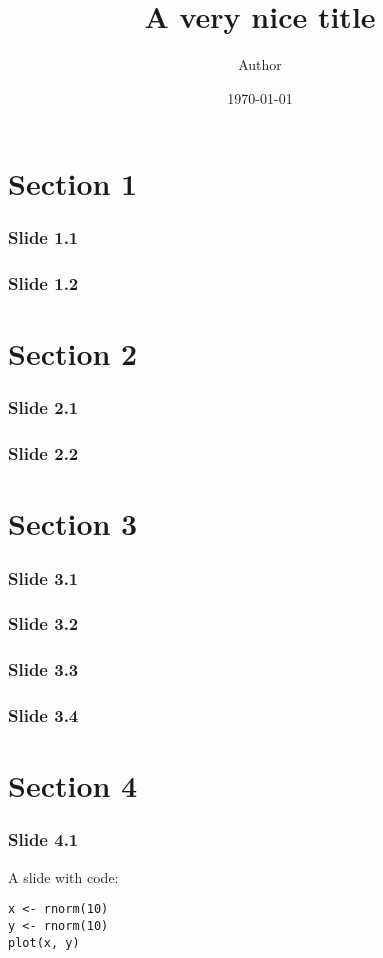 \documentclass{beamer}
\title{A very nice title}
\author{Author}
\date{\today}
\begin{document}
\begin{frame}
\titlepage
\end{frame}

\section{Section 1}

\begin{frame}
\frametitle{Slide 1.1}
\blindtext
\end{frame}

\begin{frame}
\frametitle{Slide 1.2}
\blindtext
\end{frame}

\section{Section 2}

\begin{frame}
\frametitle{Slide 2.1}
\blindtext
\end{frame}

\begin{frame}
\frametitle{Slide 2.2}
\blindtext
\end{frame}

\section{Section 3}

\begin{frame}
\frametitle{Slide 3.1}
\blindtext
\end{frame}

\begin{frame}
\frametitle{Slide 3.2}
\blindtext
\end{frame}

\begin{frame}
\frametitle{Slide 3.3}
\blindtext
\end{frame}

\begin{frame}
\frametitle{Slide 3.4}
\blindtext
\end{frame}

\section{Section 4}

\begin{frame}[fragile] %
\frametitle{Slide 4.1}
A slide with code:
\begin{verbatim}
x <- rnorm(10)
y <- rnorm(10)
plot(x, y)
\end{verbatim}
\end{frame}
\end{document}
